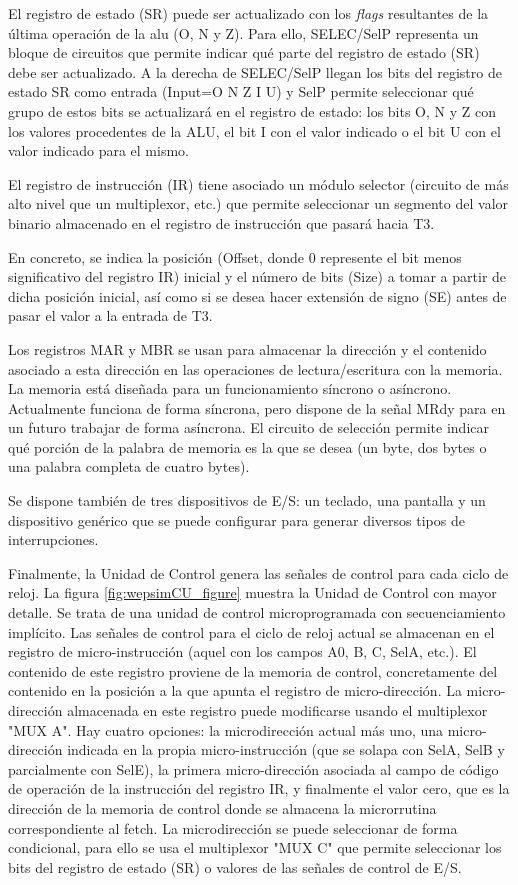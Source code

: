El registro de estado (SR) puede ser actualizado con los \emph{flags} resultantes de la última operación de la alu (O, N y Z). Para ello, SELEC/SelP representa un bloque de circuitos que permite indicar qué parte del registro de estado (SR) debe ser actualizado. A la derecha de SELEC/SelP llegan los bits del registro de estado SR como entrada (Input=O N Z I U) y SelP permite seleccionar qué grupo de estos bits se actualizará en el registro de estado: los bits O, N y Z con los valores procedentes de la ALU, el bit I con el valor indicado o el bit U con el valor indicado para el mismo.

El registro de instrucción (IR) tiene asociado un módulo selector (circuito de  más alto nivel que un multiplexor, etc.) que permite seleccionar un segmento del valor binario almacenado en el registro de instrucción que pasará hacia T3.

En concreto, se indica la posición (Offset, donde 0 represente el bit menos significativo del registro IR) inicial y el número de bits (Size) a tomar a partir de dicha posición inicial, así como si se desea hacer extensión de signo (SE) antes de pasar el valor a la entrada de T3.

Los registros MAR y MBR se usan para almacenar la dirección y el contenido asociado a esta dirección en las operaciones de lectura/escritura con la memoria. La memoria está diseñada para un funcionamiento síncrono o asíncrono. Actualmente funciona de forma síncrona, pero dispone de la señal MRdy para en un futuro trabajar de forma asíncrona. El circuito de selección permite indicar qué porción de la palabra de memoria es la que se desea (un byte, dos bytes o una palabra completa de cuatro bytes).

Se dispone también de tres dispositivos de E/S: un teclado, una pantalla y un dispositivo genérico que se puede configurar para generar diversos tipos de interrupciones.

Finalmente, la Unidad de Control genera las señales de control para cada ciclo de reloj. La figura \ref{fig:wepsimCU_figure} muestra la Unidad de Control con mayor detalle. Se trata de una unidad de control microprogramada con secuenciamiento implícito. Las señales de control para el ciclo de reloj actual se almacenan en el registro de micro-instrucción (aquel con los campos A0, B, C, SelA, etc.). El contenido de este registro proviene de la memoria de control, concretamente del contenido en la posición a la que apunta el registro de micro-dirección. La micro-dirección almacenada en este registro puede modificarse usando el multiplexor "MUX A". Hay cuatro opciones: la microdirección actual más uno, una micro-dirección indicada en la propia micro-instrucción (que se solapa con SelA, SelB y parcialmente con SelE), la primera micro-dirección asociada al campo de código de operación de la instrucción del registro IR, y finalmente el valor cero, que es la dirección de la memoria de control donde se almacena la microrrutina correspondiente al fetch. La microdirección se puede seleccionar de forma condicional, para ello se usa el multiplexor "MUX C" que permite seleccionar los bits del registro de estado (SR) o valores de las señales de control de E/S.

